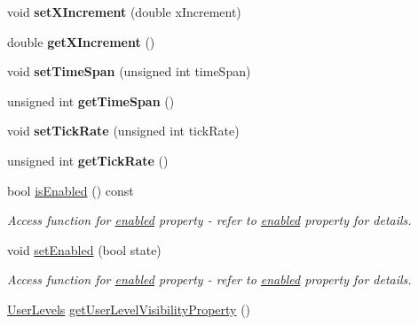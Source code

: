 \begin{DoxyCompactItemize}
\item 
\hypertarget{classQEPlot_a992cc7d8670eca7a6204b2254127373c}{
void {\bfseries setXIncrement} (double xIncrement)}
\label{classQEPlot_a992cc7d8670eca7a6204b2254127373c}

\item 
\hypertarget{classQEPlot_ac92715c78dca04685a00cc1a76fe7e38}{
double {\bfseries getXIncrement} ()}
\label{classQEPlot_ac92715c78dca04685a00cc1a76fe7e38}

\item 
\hypertarget{classQEPlot_a763a7b12b951f753afadf252c5ed4c24}{
void {\bfseries setTimeSpan} (unsigned int timeSpan)}
\label{classQEPlot_a763a7b12b951f753afadf252c5ed4c24}

\item 
\hypertarget{classQEPlot_a436de197dec68f15e69f3d98388b80b1}{
unsigned int {\bfseries getTimeSpan} ()}
\label{classQEPlot_a436de197dec68f15e69f3d98388b80b1}

\item 
\hypertarget{classQEPlot_afa648e05c2502b9735b2e0a4e10f544c}{
void {\bfseries setTickRate} (unsigned int tickRate)}
\label{classQEPlot_afa648e05c2502b9735b2e0a4e10f544c}

\item 
\hypertarget{classQEPlot_aecaa1998b445fb00efc25bb84817c4c0}{
unsigned int {\bfseries getTickRate} ()}
\label{classQEPlot_aecaa1998b445fb00efc25bb84817c4c0}

\item 
\hypertarget{classQEPlot_a7cc966cea95f9f0fc8d301a3cccbcb6a}{
bool \hyperlink{classQEPlot_a7cc966cea95f9f0fc8d301a3cccbcb6a}{isEnabled} () const }
\label{classQEPlot_a7cc966cea95f9f0fc8d301a3cccbcb6a}

\begin{DoxyCompactList}\small\item\em Access function for \hyperlink{classQEPlot_a3bce665d50cf4c8ead83b0f7b914e497}{enabled} property -\/ refer to \hyperlink{classQEPlot_a3bce665d50cf4c8ead83b0f7b914e497}{enabled} property for details. \end{DoxyCompactList}\item 
\hypertarget{classQEPlot_ad46dc348a104caa6ea69ad63d9c35469}{
void \hyperlink{classQEPlot_ad46dc348a104caa6ea69ad63d9c35469}{setEnabled} (bool state)}
\label{classQEPlot_ad46dc348a104caa6ea69ad63d9c35469}

\begin{DoxyCompactList}\small\item\em Access function for \hyperlink{classQEPlot_a3bce665d50cf4c8ead83b0f7b914e497}{enabled} property -\/ refer to \hyperlink{classQEPlot_a3bce665d50cf4c8ead83b0f7b914e497}{enabled} property for details. \end{DoxyCompactList}\item 
\hypertarget{classQEPlot_ae63588c6535de597cf83c32724f530f3}{
\hyperlink{classQEPlot_a3f70d3a05c74fdd4b58eaeed443bc323}{UserLevels} \hyperlink{classQEPlot_ae63588c6535de597cf83c32724f530f3}{getUserLevelVisibilityProperty} ()}
\label{classQEPlot_ae63588c6535de597cf83c32724f530f3}


\end{DoxyCompactItemize}
